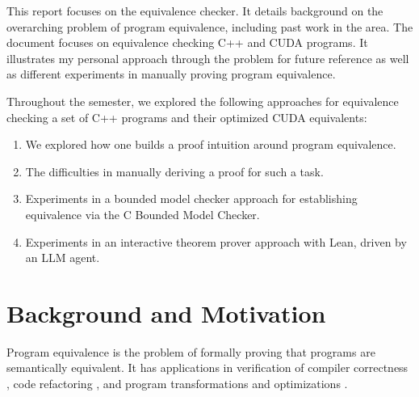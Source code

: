 \documentclass{article}
\begin{document}
This report focuses on the equivalence checker. It details background on the overarching problem of program equivalence, including past work in the area. The document focuses on equivalence checking C++ and CUDA programs. It illustrates my personal approach through the problem for future reference as well as different experiments in manually proving program equivalence. 

Throughout the semester, we explored the following approaches for equivalence checking a set of C++ programs and their optimized CUDA equivalents:

\begin{enumerate}
    \item We explored how one builds a proof intuition around program equivalence.
    \item The difficulties in manually deriving a proof for such a task.
    \item Experiments in a bounded model checker approach for establishing equivalence via the C Bounded Model Checker.
    \item Experiments in an interactive theorem prover approach with Lean, driven by an LLM agent.
\end{enumerate}


\section{Background and Motivation}

Program equivalence is the problem of formally proving that programs are semantically equivalent. It has applications in verification of compiler correctness \cite{10.1007/BFb0054170}, code refactoring \cite{10.1007/978-3-642-22110-1_55}, and program transformations and optimizations \cite{10.1145/964001.964003}.
\end{document}

